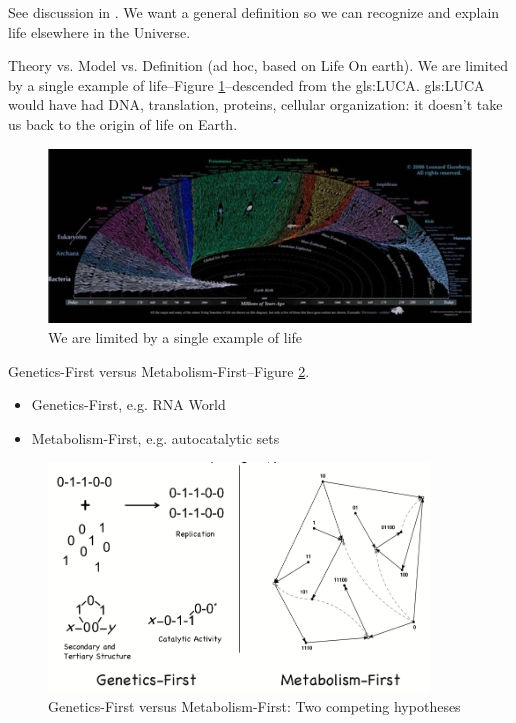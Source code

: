 \documentclass[]{article}
\begin{document}
See discussion in \cite{trifonov2011vocabulary}. We want a general definition so we can recognize and explain life elsewhere in the Universe.

Theory vs. Model vs. Definition (ad hoc, based on Life On earth). We are limited by a single example of life--Figure \ref{fig:yatol}--descended from the \gls{gls:LUCA}. \gls{gls:LUCA} would have had DNA, translation, proteins, cellular organization: it doesn't take us back to the origin of life on Earth.

\begin{figure}[H]
	\caption{We are limited by a single example of life}\label{fig:yatol}
	\includegraphics[width=\textwidth]{YATOL}
\end{figure}

Genetics-First versus Metabolism-First--Figure \ref{fig:GeneticsVsMetabolism}.

\begin{itemize}
	\item Genetics-First, e.g. RNA World
	\item Metabolism-First, e.g. autocatalytic sets
\end{itemize}

\begin{figure}[H]
	\caption{Genetics-First versus Metabolism-First: Two competing hypotheses}\label{fig:GeneticsVsMetabolism}
	\includegraphics[width=0.9\textwidth]{GeneticsVsMetabolism}
\end{figure}
\end{document}
